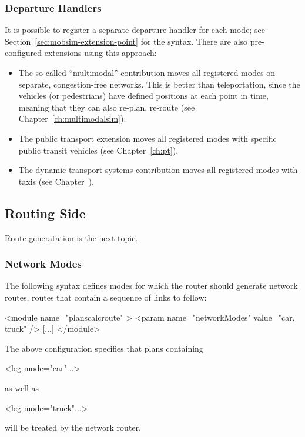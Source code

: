 \subsubsection{Departure Handlers}
\label{sec:departure-handlers}
It is possible to register a separate departure handler for each mode; see Section~\ref{sec:mobsim-extension-point} for the syntax.  There are also pre-configured extensions using this approach:
%
\begin{itemize}\styleItemize

\item The so-called ``multimodal'' contribution moves all registered modes on separate, congestion-free networks.  This is better than \gls{teleportation}, since the vehicles (or pedestrians) have defined positions at each point in time, meaning that they can also re-plan, \eg re-route (see Chapter~\ref{ch:multimodalsim}).

\item The public transport extension moves all registered modes with specific public transit vehicles (see Chapter~\ref{ch:pt}).

\item The dynamic transport systems contribution moves all registered modes with taxis (see Chapter~\pageref{ch:dts}).

\end{itemize}

\subsection{Routing Side}
Route generatation is the next topic.

\subsubsection{Network Modes}
\label{sec:network-modes}
The following syntax defines modes for which the router should generate network routes, \ie routes that contain a sequence of links to follow:
\begin{xml}
<module name="planscalcroute" >
   <param name="networkModes" value="car, truck" />
   [...]
</module>
\end{xml}
The above configuration specifies that plans containing
\begin{xml}
<leg mode="car"...>
\end{xml}
as well as
\begin{xml}
<leg mode="truck"...>
\end{xml}
will be treated by the network router.

